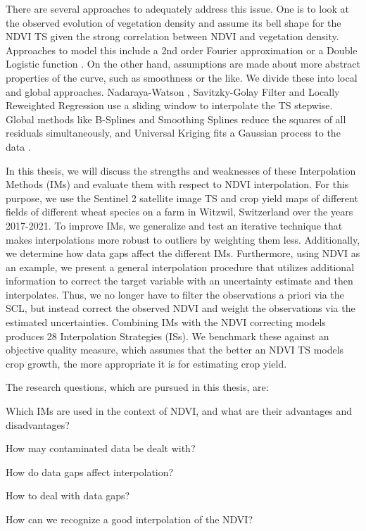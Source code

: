 There are several approaches to adequately address this issue. One is to look at the observed evolution of vegetation density and assume its bell shape for the NDVI {TS} given the strong correlation between NDVI and vegetation density. Approaches to model this include a 2nd order Fourier approximation \citep{stockliEuropeanPlantPhenology2004} or a Double Logistic function \citep{beckImprovedMonitoringVegetation2006}.
On the other hand, assumptions are made about more abstract properties of the curve, such as smoothness or the like. We divide these into local and global approaches. Nadaraya-Watson \citep{strbacEstimationEvapotrasnpirationUrban2017}, Savitzky-Golay Filter \citep{chenSimpleMethodReconstructing2004a} and Locally Reweighted Regression \citep{omoriAssessmentPaddyFields2021} use a sliding window to interpolate the {TS} stepwise. Global methods like B-Splines \citep{gurungPredictingEnhancedVegetation2009} and Smoothing Splines \citep{caiPerformanceSmoothingMethods2017} reduce the squares of all residuals simultaneously, and Universal Kriging fits a Gaussian process to the data \citep{chandolaScalableTimeSeries2010}.

In this thesis, we will discuss the strengths and weaknesses of these Interpolation Methods ({{IM}}s) and evaluate them with respect to NDVI interpolation. For this purpose, we use the Sentinel 2 satellite image {TS} and crop yield maps of different fields of different wheat species on a farm in Witzwil, Switzerland over the years 2017-2021.
To improve {{IM}}s, we generalize and test an iterative technique that makes interpolations more robust to outliers by weighting them less. Additionally, we determine how data gaps affect the different {{IM}}s. Furthermore, using NDVI as an example, we present a general interpolation procedure that utilizes additional information to correct the target variable with an uncertainty estimate and then interpolates. Thus, we no longer have to filter the observations a priori via the SCL, but instead correct the observed NDVI and weight the observations via the estimated uncertainties. Combining {{IM}}s with the NDVI correcting models produces 28 Interpolation Strategies ({{ISs}}). We benchmark these against an objective quality measure, which assumes that the better an NDVI TS models crop growth, the more appropriate it is for estimating crop yield.

\bigskip
The research questions, which are pursued in this thesis, are:
\begin{Nenumerate}
    \item Which {{IM}}s are used in the context of NDVI, and what are their advantages and disadvantages?
\item How may contaminated data be dealt with?
    \item How do data gaps affect interpolation?
\item How to deal with data gaps?
    \item How can we recognize a good interpolation of the NDVI?
\end{Nenumerate}
\bigskip

